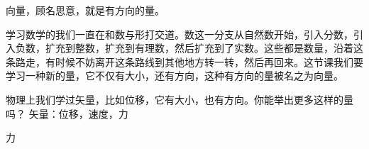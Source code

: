 \documentclass[12pt]{article}
\begin{document}
向量，顾名思意，就是有方向的量。

学习数学的我们一直在和数与形打交道。数这一分支从自然数开始，引入分数，引入负数，扩充到整数，扩充到有理数，然后扩充到了实数。这些都是数量，沿着这条路走，有时候不妨离开这条路线到其他地方转一转，然后再回来。这节课我们要学习一种新的量，它不仅有大小，还有方向，这种有方向的量被名之为向量。

物理上我们学过矢量，比如位移，它有大小，也有方向。你能举出更多这样的量吗？
矢量：位移，速度，力

力
\end{document}
